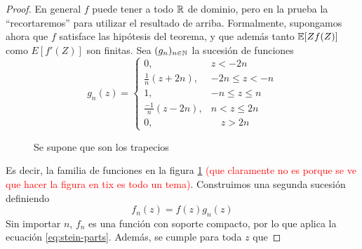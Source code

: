 \documentclass[main.tex]{subfiles}
\begin{document}
\begin{theorem}
\begin{proof}
        En general $f$ puede tener a todo $\operatorname{\mathbb{R}}$ de dominio, pero en la prueba la \enquote{recortaremos} para utilizar el resultado de arriba. Formalmente, supongamos ahora que $f$ satisface las hipótesis del teorema, y que además tanto $\operatorname{\mathbb{E}}[Zf(Z)]$ como $E[f'(Z)]$ son finitas.
        Sea $(g_n)_{n\in\operatorname{\mathbb{N}}}$ la sucesión de funciones
        \begin{equation*}
            g_n(z) = 
            \begin{cases}
                0, & z < -2n \\
                \frac{1}{n}(z+2n), & -2n \leq z < -n \\
                1, & -n \leq z \leq n \\
                \frac{-1}{n}(z-2n), & n < z \leq 2n \\
                0, & \quad z > 2n
            \end{cases}
        \end{equation*}
        \begin{figure}
            \centering
            \caption{Se supone que son los trapecios}\label{fig:trapecios}
        \end{figure}
        Es decir, la familia de funciones en la figura \ref{fig:trapecios} \textcolor{red}{(que claramente no es porque se ve que hacer la figura en tix es todo un tema)}. Construimos una segunda sucesión definiendo
        \begin{equation*}
            f_n(z) = f(z)g_n(z)
        \end{equation*}
        Sin importar $n$, $f_n$ es una función con soporte compacto, por lo que aplica la ecuación \eqref{eq:stein-parts}. Además, se cumple para toda $z$ que

\end{proof}
\end{theorem}
\end{document}
